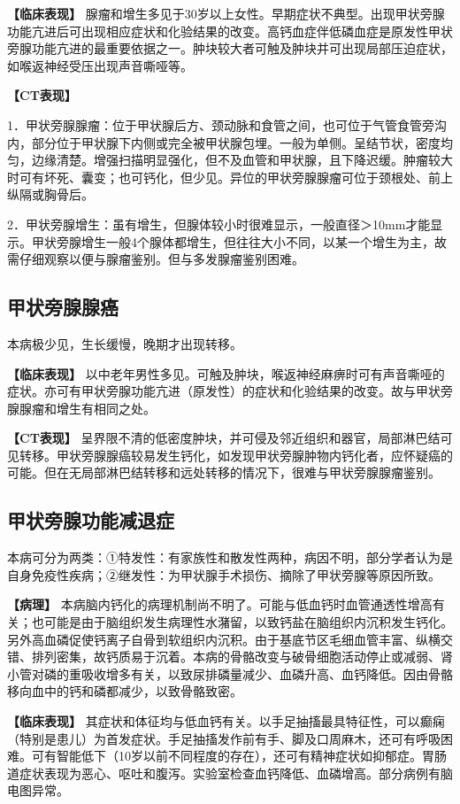 \textbf{【临床表现】}
腺瘤和增生多见于30岁以上女性。早期症状不典型。出现甲状旁腺功能亢进后可出现相应症状和化验结果的改变。高钙血症伴低磷血症是原发性甲状旁腺功能亢进的最重要依据之一。肿块较大者可触及肿块并可出现局部压迫症状，如喉返神经受压出现声音嘶哑等。

\textbf{【CT表现】}

1．甲状旁腺腺瘤：位于甲状腺后方、颈动脉和食管之间，也可位于气管食管旁沟内，部分位于甲状腺下内侧或完全被甲状腺包埋。一般为单侧。呈结节状，密度均匀，边缘清楚。增强扫描明显强化，但不及血管和甲状腺，且下降迟缓。肿瘤较大时可有坏死、囊变；也可钙化，但少见。异位的甲状旁腺腺瘤可位于颈根处、前上纵隔或胸骨后。

2．甲状旁腺增生：虽有增生，但腺体较小时很难显示，一般直径＞10mm才能显示。甲状旁腺增生一般4个腺体都增生，但往往大小不同，以某一个增生为主，故需仔细观察以便与腺瘤鉴别。但与多发腺瘤鉴别困难。

\subsection{甲状旁腺腺癌}

本病极少见，生长缓慢，晚期才出现转移。

\textbf{【临床表现】}
以中老年男性多见。可触及肿块，喉返神经麻痹时可有声音嘶哑的症状。亦可有甲状旁腺功能亢进（原发性）的症状和化验结果的改变。故与甲状旁腺腺瘤和增生有相同之处。

\textbf{【CT表现】}
呈界限不清的低密度肿块，并可侵及邻近组织和器官，局部淋巴结可见转移。甲状旁腺腺癌较易发生钙化，如发现甲状旁腺肿物内钙化者，应怀疑癌的可能。但在无局部淋巴结转移和远处转移的情况下，很难与甲状旁腺腺瘤鉴别。

\subsection{甲状旁腺功能减退症}

本病可分为两类：①特发性：有家族性和散发性两种，病因不明，部分学者认为是自身免疫性疾病；②继发性：为甲状腺手术损伤、摘除了甲状旁腺等原因所致。

\textbf{【病理】}
本病脑内钙化的病理机制尚不明了。可能与低血钙时血管通透性增高有关；也可能是由于脑组织发生病理性水潴留，以致钙盐在脑组织内沉积发生钙化。另外高血磷促使钙离子自骨到软组织内沉积。由于基底节区毛细血管丰富、纵横交错、排列密集，故钙质易于沉着。本病的骨骼改变与破骨细胞活动停止或减弱、肾小管对磷的重吸收增多有关，以致尿排磷量减少、血磷升高、血钙降低。因由骨骼移向血中的钙和磷都减少，以致骨骼致密。

\textbf{【临床表现】}
其症状和体征均与低血钙有关。以手足抽搐最具特征性，可以癫痫（特别是患儿）为首发症状。手足抽搐发作前有手、脚及口周麻木，还可有呼吸困难。可有智能低下（10岁以前不同程度的存在），还可有精神症状如抑郁症。胃肠道症状表现为恶心、呕吐和腹泻。实验室检查血钙降低、血磷增高。部分病例有脑电图异常。

